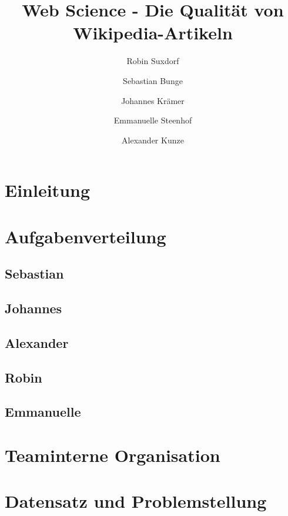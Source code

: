 \documentclass[researchlab,palatino]{AIGpaper}
\author{Robin Suxdorf \and Sebastian Bunge \and Johannes Krämer \and Emmanuelle Steenhof \and Alexander Kunze}
\title{Web Science - Die Qualität von Wikipedia-Artikeln}
\begin{document}
\maketitle %


\section{Einleitung}


\section{Aufgabenverteilung}
\label{Aufgabenverteilung}


\subsection{Sebastian}
\label{sec:Sebastian}


\subsection{Johannes}


\subsection{Alexander}


\subsection{Robin}


\subsection{Emmanuelle}


\section{Teaminterne Organisation}
\label{Organisation}



\section{Datensatz und Problemstellung}
\label{Datensatz}

\end{document}
